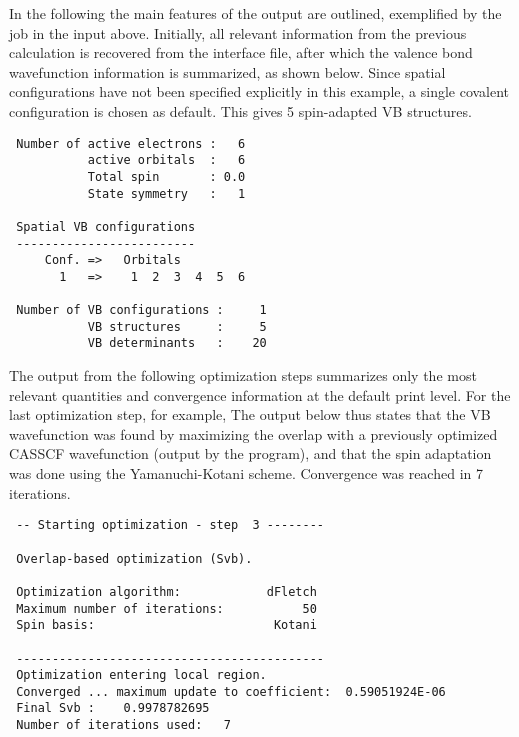In the following the main features of the output are outlined, exemplified by 
the job in the input above. Initially, all relevant information
from the previous  calculation is recovered from the 
 interface file, after which the valence bond wavefunction 
information is summarized, as shown below. Since 
spatial configurations have not been specified explicitly in this example, a 
single covalent configuration is chosen as default. This gives 5 spin-adapted 
VB structures.

{\begin{footnotesize}
\begin{verbatim}
 Number of active electrons :   6
           active orbitals  :   6
           Total spin       : 0.0
           State symmetry   :   1

 Spatial VB configurations
 -------------------------
     Conf. =>   Orbitals
       1   =>    1  2  3  4  5  6

 Number of VB configurations :     1
           VB structures     :     5
           VB determinants   :    20
\end{verbatim}
\end{footnotesize}}

The output from the following optimization steps summarizes only the most 
relevant quantities and convergence information at the default print level. For 
the last optimization step, for example, The output below thus
states that the VB wavefunction was found by maximizing the overlap with a 
previously optimized CASSCF wavefunction (output by the  
program), and that the spin adaptation was done using the Yamanuchi-Kotani 
scheme. Convergence was reached in 7 iterations.

{\begin{footnotesize}
\begin{verbatim}
 -- Starting optimization - step  3 --------

 Overlap-based optimization (Svb).

 Optimization algorithm:            dFletch
 Maximum number of iterations:           50
 Spin basis:                         Kotani

 -------------------------------------------
 Optimization entering local region.
 Converged ... maximum update to coefficient:  0.59051924E-06
 Final Svb :    0.9978782695
 Number of iterations used:   7
\end{verbatim}
\end{footnotesize}}

